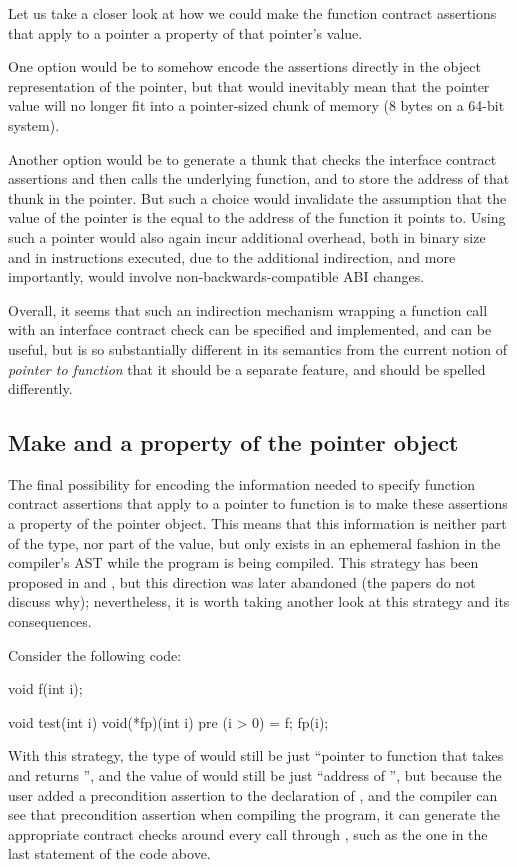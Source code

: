 Let us take a closer look at how we could make the function contract assertions that apply to a pointer a property of that pointer's value.

One option would be to somehow encode the assertions directly in the object representation of the pointer, but that would inevitably mean that the pointer value will no longer fit into a pointer-sized chunk of memory (8 bytes on a 64-bit system).

Another option would be to generate a thunk that checks the interface contract assertions and then calls the underlying function, and to store the address of that thunk in the pointer. But such a choice would invalidate the assumption that the value of the pointer is the equal to the address of the function it points to. Using such a pointer would also again incur additional overhead, both in binary size and in instructions executed, due to the additional indirection, and more importantly, would involve non-backwards-compatible ABI changes.

Overall, it seems that such an indirection mechanism wrapping a function call with an interface contract check can be specified and implemented, and can be useful, but is so substantially different in its semantics from the current notion of \emph{pointer to function} that it should be a separate feature, and should be spelled differently.

\subsection{Make  and  a property of the pointer object}

The final possibility for encoding the information needed to specify function contract assertions that apply to a pointer to function is to make these assertions a property of the pointer object. This means that this information is neither part of the type, nor part of the value, but only exists in an ephemeral fashion in the compiler's AST while the program is being compiled. This strategy has been proposed in \cite{P0246R0} and \cite{P0247R0}, but this direction was later abandoned (the papers do not discuss why); nevertheless, it is worth taking another look at this strategy and its consequences.

Consider the following code:

\begin{codeblock}
void f(int i);

void test(int i) {
  void(*fp)(int i) pre (i > 0) = f;
  fp(i);
}
\end{codeblock}
With this strategy, the type of  would still be just ``pointer to function that takes  and returns '', and the value of  would still be just ``address of '', but because the user added a precondition assertion to the declaration of , and the compiler can see that precondition assertion when compiling the program, it can generate the appropriate contract checks around every call through , such as the one in the last statement of the code above.

